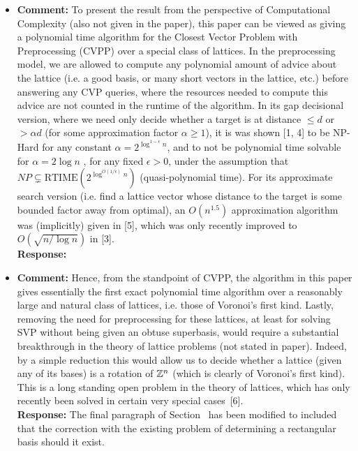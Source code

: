 \documentclass[a4paper,10pt]{article}
\begin{document}
\begin{itemize}
\item\textbf{Comment:} 
To present the result from the perspective of Computational Complexity (also not given in the
paper), this paper can be viewed as giving a polynomial time algorithm for the Closest Vector
Problem with Preprocessing (CVPP) over a special class of lattices. In the preprocessing model,
we are allowed to compute any polynomial amount of advice about the lattice (i.e. a good basis, or many short vectors in the lattice, etc.) before answering any CVP queries, where the resources needed to compute this advice are not counted in the runtime of the algorithm. In its
gap decisional version, where we need only decide whether a target is at distance $\leq d$ or $> \alpha d$
(for some approximation factor $\alpha \geq 1$), it is was shown [1, 4] to be NP-Hard for any constant $\alpha = 2^{\log^{1-\epsilon}n}$, and to not be polynomial time solvable for $\alpha = 2 \log n$ , for any fixed $\epsilon > 0$, under the assumption  that $NP \subsetneq \text{RTIME}(2^{\log^{O(1/\epsilon)}n})$ (quasi-polynomial time). For its approximate search version (i.e. find a lattice vector whose distance to the target is some bounded factor away from optimal), an $O(n^{1.5})$ approximation algorithm was (implicitly) given in [5], which was only recently improved to $O( \sqrt{ n / \log n} )$ in [3].
\\\textbf{Response:}

\item\textbf{Comment:} 
Hence, from the standpoint of CVPP, the algorithm in this paper gives essentially the first
exact polynomial time algorithm over a reasonably large and natural class of lattices, i.e. those
of Voronoi’s first kind. Lastly, removing the need for preprocessing for these lattices, at least for
solving SVP without being given an obtuse superbasis, would require a substantial breakthrough
in the theory of lattice problems (not stated in paper). Indeed, by a simple reduction this would
allow us to decide whether a lattice (given any of its bases) is a rotation of ${\mathbb Z}^n$ (which is clearly
of Voronoi’s first kind). This is a long standing open problem in the theory of lattices, which has
only recently been solved in certain very special cases~[6].
\\\textbf{Response:}
The final paragraph of Section~ has been modified to included that the correction with the existing problem of determining a rectangular basis should it exist.


\end{itemize}
\end{document}
